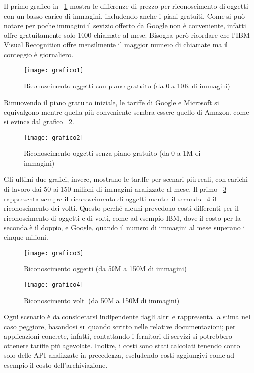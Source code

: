 Il primo grafico in ~\ref{fig:grafico1} mostra le differenze di prezzo per riconoscimento di oggetti con un basso carico di immagini, includendo anche i piani gratuiti.
Come si può notare per poche immagini il sevizio offerto da Google non è conveniente, infatti offre gratuitamente solo 1000 chiamate al mese.
Bisogna però ricordare che l'IBM Visual Recognition offre mensilmente il maggior numero di chiamate ma il conteggio è giornaliero.
\begin{figure}[!h]
\begin{center}
	\texttt{[image: grafico1]}
{\scriptsize
\caption{Riconoscimento oggetti con piano gratuito (da 0 a 10K di immagini)}
\label{fig:grafico1}}
\end{center}
\end{figure}
%
%
Rimuovendo il piano gratuito iniziale, le tariffe di Google e Microsoft si equivalgono mentre quella più conveniente sembra essere quello di Amazon,
come si evince dal grafico ~\ref{fig:grafico2}.
\begin{figure}[!h]
\begin{center}
	\texttt{[image: grafico2]}
{\scriptsize \caption{Riconoscimento oggetti senza piano gratuito (da 0 a 1M di immagini)}
\label{fig:grafico2}}
\end{center}
\end{figure}
%
%
Gli ultimi due grafici, invece, mostrano le tariffe per scenari più reali, con carichi di lavoro dai 50 ai 150 milioni di immagini analizzate al mese.
Il primo ~\ref{fig:grafico3} rappresenta sempre il riconoscimento di oggetti mentre il secondo ~\ref{fig:grafico4} il riconoscimento dei volti.
Questo perché alcuni prevedono costi differenti per il riconoscimento di oggetti e di volti, come ad esempio IBM, dove il costo per la seconda è il doppio,
e Google, quando il numero di immagini al mese superano i cinque milioni.
\begin{figure}[!h]
\begin{center}
	\texttt{[image: grafico3]}
{\scriptsize \caption{Riconoscimento oggetti (da 50M a 150M di immagini)}
\label{fig:grafico3}}
\end{center}
\end{figure}
%
\begin{figure}[!h]
\begin{center}
	\texttt{[image: grafico4]}
{\scriptsize \caption{Riconoscimento volti (da 50M a 150M di immagini)}
\label{fig:grafico4}}
\end{center}
\end{figure}
%
%

Ogni scenario è da considerarsi indipendente dagli altri e rappresenta la stima nel caso peggiore, basandosi su quando scritto nelle relative documentazioni;
per applicazioni concrete, infatti, contattando i fornitori di servizi si potrebbero ottenere tariffe più agevolate.
Inoltre, i costi sono stati calcolati tenendo conto solo delle API analizzate in precedenza, escludendo costi aggiungivi come ad esempio il costo dell'archiviazione.
%
%
